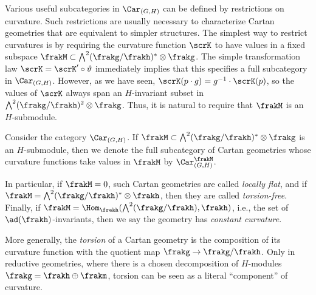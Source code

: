 Various useful subcategories in $\Car_{(G,H)}$ can be defined by restrictions on curvature. Such restrictions are usually necessary to characterize Cartan geometries that are equivalent to simpler structures. The simplest way to restrict curvatures is by requiring the curvature function $\scrK$ to have values in a fixed subspace $\frakM\subset \bigwedge\nolimits^2(\frakg\slash\frakh)^\ast\otimes\frakg$. The simple transformation law $\scrK=\scrK'\circ \vartheta$ immediately implies that this specifies a full subcategory in $\Car_{(G,H)}$. However, as we have seen, $\scrK(p\cdot g)=g^{-1}\cdot \scrK(p)$, so the values of $\scrK$ always span an $H$-invariant subset in $\bigwedge\nolimits^2(\frakg\slash\frakh)^2\otimes\frakg$. Thus, it is natural to require that $\frakM$ is an $H$-submodule. 

\begin{defn}\label{def category of cartan geom}
    Consider the category $\Car_{(G,H)}$. If $\frakM\subset \bigwedge\nolimits^2(\frakg\slash\frakh)^\ast\otimes\frakg$ is an $H$-submodule, then we denote the full subcategory of Cartan geometries whose curvature functions take values in $\frakM$ by $\Car_{(G,H)}^\frakM$.

    In particular, if $\frakM=0$, such Cartan geometries are called \emph{locally flat}, and if $\frakM=\bigwedge\nolimits^2(\frakg\slash\frakh)^\ast\otimes\frakh$, then they are called \emph{torsion-free}. Finally, if $\frakM=\Hom_\frakh(\bigwedge\nolimits^2(\frakg\slash\frakh), \frakh)$, i.e., the set of $\ad(\frakh)$-invariants, then we say the geometry has \emph{constant curvature}.
\end{defn}

More generally, the \emph{torsion} of a Cartan geometry is the composition of its curvature function with the quotient map $\frakg\to \frakg\slash\frakh$. Only in reductive geometries, where there is a chosen decomposition of $H$-modules $\frakg=\frakh\oplus\frakm$, torsion can be seen as a literal ``component'' of curvature.

